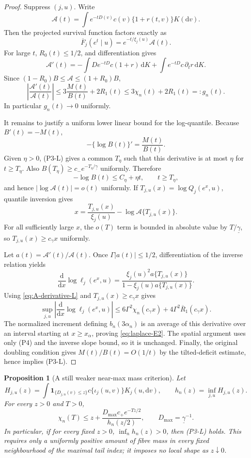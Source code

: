 \documentclass[11pt]{article}
\newtheorem{proposition}[theorem]{Proposition}
\theoremstyle{definition}\newtheorem{definition}[theorem]{Definition}
\begin{document}
\begin{proof}
Suppress $(j,u)$.  Write
\[
 \mathcal A(t)=\int e^{-tD(v)}c(v)\{1+r(t,v)\}K(\mathrm dv).
\]
Then the projected survival function factors exactly as
\[
 \overline F_j(e^t\mid u)=e^{-t/\xi_j(u)}\mathcal A(t).
\]
For large $t$, $R_0(t)\le1/2$, and differentiation gives
\[
 \mathcal A'(t)
 =-\int De^{-tD}c(1+r)\,\mathrm dK
   +\int e^{-tD}c\,\partial_tr\,\mathrm dK.
\]
Since
$(1-R_0)B\le\mathcal A\le(1+R_0)B$,
\begin{equation}
 \left|\frac{\mathcal A'(t)}{\mathcal A(t)}\right|
 \le3\frac{M(t)}{B(t)}+2R_1(t)
 \le3\chi_n(t)+2R_1(t)=:g_n(t).
 \label{eq:A-derivative-L}
\end{equation}
In particular $g_n(t)\to0$ uniformly.

It remains to justify a uniform lower linear bound for the log-quantile.
Because $B'(t)=-M(t)$,
\[
 -\{\log B(t)\}'=\frac{M(t)}{B(t)}.
\]
Given $\eta>0$, (P3-L) gives a common $T_\eta$ such that this derivative is
at most $\eta$ for $t\ge T_\eta$.  Also
$B(T_\eta)\ge c_-e^{-T_\eta/\underline\gamma}$ uniformly.  Therefore
\[
 -\log B(t)\le C_\eta+\eta t,
 \qquad t\ge T_\eta,
\]
and hence $|\log\mathcal A(t)|=o(t)$ uniformly.  If
$T_{j,u}(x)=\log Q_j(e^x,u)$, quantile inversion gives
\[
 x=\frac{T_{j,u}(x)}{\xi_j(u)}
   -\log\mathcal A\{T_{j,u}(x)\}.
\]
For all sufficiently large $x$, the $o(T)$ term is bounded in absolute value
by $T/\underline\gamma$, so
$T_{j,u}(x)\ge c_\gamma x$ uniformly.

Let $a(t)=\mathcal A'(t)/\mathcal A(t)$.  Once
$\Gamma|a(t)|\le1/2$, differentiation of the inverse relation yields
\[
 \frac{\mathrm d}{\mathrm dx}\log\ell_j(e^x,u)
 =\frac{\xi_j(u)^2a\{T_{j,u}(x)\}}
        {1-\xi_j(u)a\{T_{j,u}(x)\}}.
\]
Using \eqref{eq:A-derivative-L} and
$T_{j,u}(x)\ge c_\gamma x$ gives
\[
 \sup_{j,u}\left|
 \frac{\mathrm d}{\mathrm dx}\log\ell_j(e^x,u)
 \right|
 \le6\Gamma^2\chi_n(c_\gamma x)
   +4\Gamma^2\overline R_1(c_\gamma x).
\]
The normalized increment defining $b_n(3\alpha_n)$ is an average of this
derivative over an interval starting at $x\ge x_\alpha$, proving
\eqref{eq:laplace-E2}.  The spatial argument uses only (P4) and the inverse
slope bound, so it is unchanged.  Finally, the original doubling condition
gives $M(t)/B(t)=O(1/t)$ by the tilted-deficit estimate, hence implies
(P3-L).
\end{proof}

\begin{proposition}[A still weaker near-max mass criterion]
\label{prop:nearmax-mass}
Let
\[
 H_{j,u}(z)=\int\mathbf1_{\{D_{j,u}(v)\le z\}}
 c\{\iota_j(u,v)\}K_j(u,\mathrm dv),
 \qquad
 h_n(z)=\inf_{j,u}H_{j,u}(z).
\]
For every $z>0$ and $T>0$,
\begin{equation}
 \chi_n(T)
 \le z+\frac{D_{\max}c_+e^{-Tz/2}}{h_n(z/2)},
 \qquad D_{\max}=\underline\gamma^{-1}.
 \label{eq:nearmax-chi}
\end{equation}
In particular, if for every fixed $z>0$,
$\inf_n h_n(z)>0$, then (P3-L) holds.  This requires only a uniformly
positive amount of fibre mass in every fixed neighbourhood of the maximal
tail index; it imposes no local shape as $z\downarrow0$.
\end{proposition}
\end{document}
